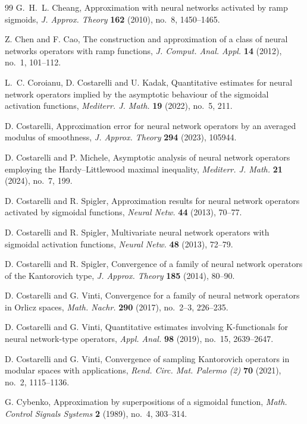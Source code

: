 \documentclass[12pt, reqno]{amsart}
\numberwithin{equation}{section}
\theoremstyle{definition}
\theoremstyle{remark}
\numberwithin{equation}{section}
\begin{document}
\begin{thebibliography}{99}
 G.~H.~L. Cheang, Approximation with neural networks activated by ramp sigmoids, \textit{J. Approx. Theory} \textbf{162} (2010), no.~8, 1450--1465.

 Z. Chen and F. Cao, The construction and approximation of a class of neural networks operators with ramp functions, \textit{J. Comput. Anal. Appl.} \textbf{14} (2012), no.~1, 101--112.

 L.~C. Coroianu, D. Costarelli and U. Kadak, Quantitative estimates for neural network operators implied by the asymptotic behaviour of the sigmoidal activation functions, \textit{Mediterr. J. Math.} \textbf{19} (2022), no.~5, 211.

 D. Costarelli, Approximation error for neural network operators by an averaged modulus of smoothness, \textit{J. Approx. Theory} \textbf{294} (2023), 105944.

 D. Costarelli and P. Michele, Asymptotic analysis of neural network operators employing the Hardy--Littlewood maximal inequality, \textit{Mediterr. J. Math.} \textbf{21} (2024), no.~7, 199.

 D. Costarelli and R. Spigler, Approximation results for neural network operators activated by sigmoidal functions, \textit{Neural Netw.} \textbf{44} (2013), 70--77.

 D. Costarelli and R. Spigler, Multivariate neural network operators with sigmoidal activation functions, \textit{Neural Netw.} \textbf{48} (2013), 72--79.

 D. Costarelli and R. Spigler, Convergence of a family of neural network operators of the Kantorovich type, \textit{J. Approx. Theory} \textbf{185} (2014), 80--90.

 D. Costarelli and G. Vinti, Convergence for a family of neural network operators in Orlicz spaces, \textit{Math. Nachr.} \textbf{290} (2017), no.~2--3, 226--235.

 D. Costarelli and G. Vinti, Quantitative estimates involving K-functionals for neural network-type operators, \textit{Appl. Anal.} \textbf{98} (2019), no.~15, 2639--2647.

 D. Costarelli and G. Vinti, Convergence of sampling Kantorovich operators in modular spaces with applications, \textit{Rend. Circ. Mat. Palermo (2)} \textbf{70} (2021), no.~2, 1115--1136.

 G. Cybenko, Approximation by superpositions of a sigmoidal function, \textit{Math. Control Signals Systems} \textbf{2} (1989), no.~4, 303--314.


\end{thebibliography}
\end{document}
